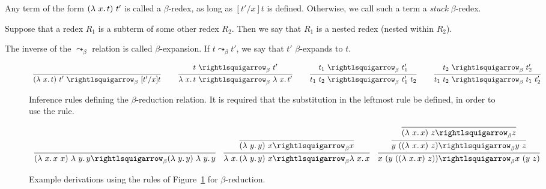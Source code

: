 \begin{definition}
  Any term of the form $(\lam{x}{t})\ t'$ is called a $\beta$-redex,
  as long as $[t'/x]t$ is defined.  Otherwise, we call such a term
  a \emph{stuck} $\beta$-redex.
  \end{definition}

\begin{definition}
  Suppose that a redex $R_1$ is a subterm of some other redex $R_2$.
  Then we say that $R_1$ is a nested redex (nested within $R_2$).
  \end{definition}
 
\begin{definition}
\label{def:betaexpand}
  The inverse of the $\leadsto_\beta$ relation is called
  $\beta$-expansion.  If $t \leadsto_\beta t'$, we say
  that $t'$ $\beta$-expands to $t$.
\end{definition}

\begin{figure}
  \[
  \begin{array}{lllllll}
\infer{(\lam{x}{t})\ t'\ \curva_\beta\ [t'/x]t}{\ } & \ &
\infer{\lam{x}{t}\ \curva_\beta\ \lam{x}{t'}}{t\ \curva_\beta\ t'} & \ &
\infer{t_1\ t_2\ \curva_\beta\ t_1'\ t_2}{t_1\ \curva_\beta\ t_1'} &\ &
\infer{t_1\ t_2\ \curva_\beta\ t_1\ t_2'}{t_2\ \curva_\beta\ t_2'}
  \end{array}
  \]
  \caption{Inference rules defining the $\beta$-reduction relation.  It is required that the substitution in the leftmost rule be defined, in order to use the rule.}
  \label{fig:betar}
\end{figure}

\begin{figure}
  \[
  \begin{array}{lll}
    \infer{(\lam{x}{x\ x})\ \lam{y}{y} \betar (\lam{y}{y})\ \lam{y}{y}}
          {\ }
    &
    \infer{\lam{x}{(\lam{y}{y})\ x} \betar \lam{x}{x}}
          {\infer{(\lam{y}{y})\ x \betar x}{\ }}

    &

    \infer{x\ (y\ ((\lam{x}{x})\ z)) \betar x\ (y\ z)}
          {\infer{y\ ((\lam{x}{x})\ z) \betar y\ z}
            {\infer{(\lam{x}{x})\ z \betar z}{\ }}}
  \end{array}
\]
\caption{Example derivations using the rules of Figure~\ref{fig:betar} for $\beta$-reduction.}
\label{fig:betarex}
\end{figure}

